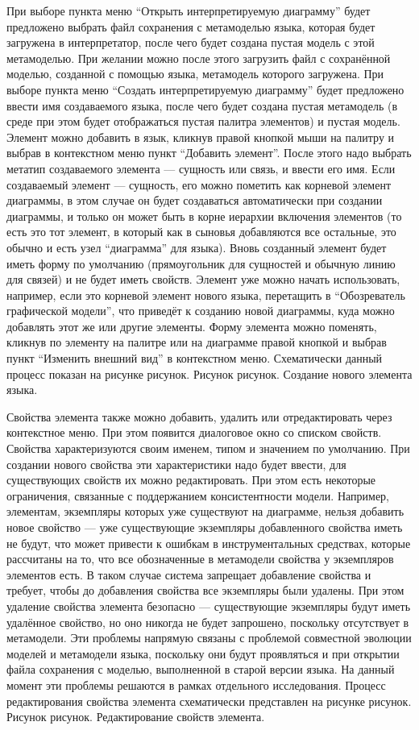 	При выборе пункта меню “Открыть интерпретируемую диаграмму” будет предложено выбрать файл сохранения с метамоделью языка, которая будет загружена в интерпретатор, после чего будет создана пустая модель с этой метамоделью. При желании можно после этого загрузить файл с сохранённой моделью, созданной с помощью языка, метамодель которого загружена. При выборе пункта меню “Создать интерпретируемую диаграмму” будет предложено ввести имя создаваемого языка, после чего будет создана пустая метамодель (в среде при этом будет отображаться пустая палитра элементов) и пустая модель.
	Элемент можно добавить в язык, кликнув правой кнопкой мыши на палитру и выбрав в контекстном меню пункт “Добавить элемент”. После этого надо выбрать метатип создаваемого элемента --- сущность или связь, и ввести его имя. Если создаваемый элемент --- сущность, его можно пометить как корневой элемент диаграммы, в этом случае он будет создаваться автоматически при создании диаграммы, и только он может быть в корне иерархии включения элементов (то есть это тот элемент, в который как в сыновья добавляются все остальные, это обычно и есть узел “диаграмма” для языка). Вновь созданный элемент будет иметь форму по умолчанию (прямоугольник для сущностей и обычную линию для связей) и не будет иметь свойств. Элемент уже можно начать использовать, например, если это корневой элемент нового языка, перетащить в “Обозреватель графической модели”, что приведёт к созданию новой диаграммы, куда можно добавлять этот же или другие элементы. Форму элемента можно поменять, кликнув по элементу на палитре или на диаграмме правой кнопкой и выбрав пункт “Изменить внешний вид” в контекстном меню. Схематически данный процесс показан на рисунке рисунок.
Рисунок рисунок. Создание нового элемента языка.

	Свойства элемента также можно добавить, удалить или отредактировать через контекстное меню. При этом появится диалоговое окно со списком свойств. Свойства характеризуются своим именем, типом и значением по умолчанию. При создании нового свойства эти характеристики надо будет ввести, для существующих свойств их можно редактировать. При этом есть некоторые ограничения, связанные с поддержанием консистентности модели. Например, элементам, экземпляры которых уже существуют на диаграмме, нельзя добавить новое свойство --- уже существующие экземпляры добавленного свойства иметь не будут, что может привести к ошибкам в инструментальных средствах, которые рассчитаны на то, что все обозначенные в метамодели свойства у экземпляров элементов есть. В таком случае система запрещает добавление свойства и требует, чтобы до добавления свойства все экземпляры были удалены. При этом удаление свойства элемента безопасно --- существующие экземпляры будут иметь удалённое свойство, но оно никогда не будет запрошено, поскольку отсутствует в метамодели. Эти проблемы напрямую связаны с проблемой совместной эволюции моделей и метамодели языка, поскольку они будут проявляться и при открытии файла сохранения с моделью, выполненной в старой версии языка. На данный момент эти проблемы решаются в рамках отдельного исследования. Процесс редактирования свойства элемента схематически представлен на рисунке рисунок.
Рисунок рисунок. Редактирование свойств элемента.
